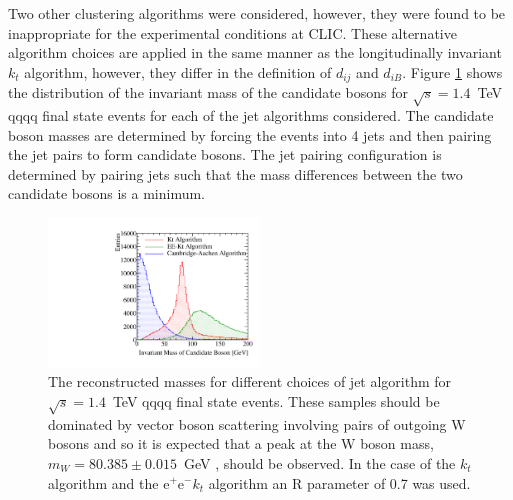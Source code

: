 \noindent Two other clustering algorithms were considered, however, they were found to be inappropriate for the experimental conditions at CLIC.  These alternative algorithm choices are applied in the same manner as the longitudinally invariant $k_{t}$ algorithm, however, they differ in the definition of $d_{ij}$ and $d_{iB}$.  Figure \ref{fig:invariantmassalgoveto} shows the distribution of the invariant mass of the candidate bosons for $\sqrt{s}=1.4$~TeV \nu{\nu}qqqq final state events for each of the jet algorithms considered.  The candidate boson masses are determined by forcing the events into 4 jets and then pairing the jet pairs to form candidate bosons.  The jet pairing configuration is determined by pairing jets such that the mass differences between the two candidate bosons is a minimum.  

\begin{figure}[h!]
\centering
\includegraphics[width=0.5\textwidth]{PhysicsAnalysis/Plots/SimpleInvMassPlot/InvariantMassesAlgorithmVeto.pdf}
\caption[The reconstructed masses for different choices of jet algorithm for $\sqrt{s}=1.4$~TeV \nu{\nu}qqqq final state events.  These samples should be dominated by vector boson scattering involving pairs of outgoing W bosons and so it is expected that a peak at the W boson mass, $m_{W} = 80.385 \pm 0.015$~GeV \cite{Beringer:1900zz}, should be observed.  In the case of the $k_{t}$ algorithm and the $\text{e}^{+}\text{e}^{-}k_{t}$  algorithm an R parameter of 0.7 was used.]{The reconstructed masses for different choices of jet algorithm for $\sqrt{s}=1.4$~TeV \nu{\nu}qqqq final state events.  These samples should be dominated by vector boson scattering involving pairs of outgoing W bosons and so it is expected that a peak at the W boson mass, $m_{W} = 80.385 \pm 0.015$~GeV \cite{Beringer:1900zz}, should be observed.  In the case of the $k_{t}$ algorithm and the $\text{e}^{+}\text{e}^{-}k_{t}$  algorithm an R parameter of 0.7 was used.}
\label{fig:invariantmassalgoveto}
\end{figure}

